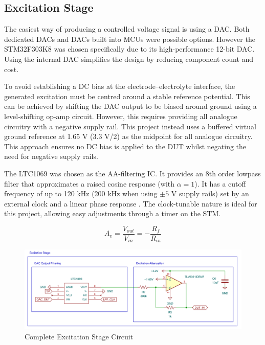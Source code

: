\subsection{Excitation Stage}\label{subsec:design_excitation}
The easiest way of producing a controlled voltage signal is using a \ac{DAC}. Both dedicated \acp{DAC} and \acp{DAC} built into \acp{MCU} were possible options. However the STM32F303K8 was chosen specifically due to its high-performance 12-bit \ac{DAC}. Using the internal \ac{DAC} simplifies the design by reducing component count and cost.

To avoid establishing a DC bias at the electrode–electrolyte interface, the generated excitation must be centred around a stable reference potential. This can be achieved by shifting the \ac{DAC} output to be biased around ground using a level-shifting op-amp circuit. However, this requires providing all analogue circuitry with a negative supply rail. This project instead uses a buffered virtual ground reference at 1.65 V (3.3 V/2) as the midpoint for all analogue circuitry. This approach ensures no DC bias is applied to the \ac{DUT} whilst negating the need for negative supply rails.

The LTC1069 was chosen as the AA-filtering \ac{IC}. It provides an 8th order lowpass filter that approximates a raised cosine response (with $\alpha=1$). It has a cutoff frequency of up to 120 kHz (200 kHz when using $\pm5$ V supply rails) set by an external clock and a linear phase response \cite{LTC10697CS8PBF}. The clock-tunable nature is ideal for this project, allowing easy adjustments through a timer on the STM.

\begin{equation}
    A_v = \frac{V_{out}}{V_{in}} = -\frac{R_f}{R_{in}}
    \label{eq:inv_opamp_gain}
\end{equation}

\begin{figure}[H]
    \centering
    \includegraphics[width=\textwidth]{ExcitationSchem.png}
    \caption{Complete Excitation Stage Circuit}
    \label{fig:excitation_stage_circuit}
\end{figure}

